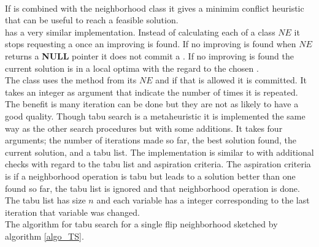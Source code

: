 \DecMargin{1em} \\
If  is combined with the neighborhood class  it gives a minimim 
conflict heuristic that can be useful to reach a feasible solution. \\ 
 has a very similar implementation. Instead of calculating each  of a 
 class $NE$ it stops requesting a  once an improving  is found. If no 
improving  is found when $NE$ returns a \textbf{NULL} pointer it does not commit a . If no 
improving  is found the current solution is in a local optima with the regard to the chosen 
. \\ 
The class  uses the method  from its  $NE$ and if that 
 is allowed it is committed. It takes an integer as argument that indicate the number of times it is 
repeated. The benefit is many iteration can be done but they are not as likely to have a good quality.  
Though tabu search is a metaheuristic it is implemented the same way as the other search procedures but with some 
additions. It takes four arguments; the number of iterations made so far, the best solution found, the current 
solution, and a tabu list. The implementation is similar to  with additional checks with regard 
to the tabu list and aspiration criteria. The aspiration criteria is if a neighborhood operation is tabu but leads to a 
solution better than one found so far, the tabu list is ignored and that neighborhood operation is done. The 
tabu list has size $n$ and each variable has a integer corresponding to the last iteration that variable was 
changed. \\ 
The algorithm for tabu search for a single flip neighborhood sketched by algorithm \ref{algo_TS}. \\ 
\IncMargin{1em}
